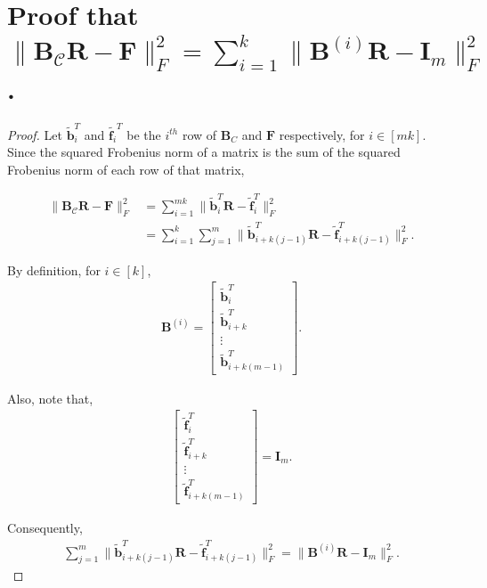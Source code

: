 \documentclass[journal,draftcls,onecolumn]{IEEEtran}
\theoremstyle{mystyle}
\newcommand{\aditya}[1]{\marginpar{+}{\bf Aditya's remark}: {\em #1}}
\newcommand{\sifat}[1]{\marginpar{+}{\bf Sifat's remark}: {\em #1}}
\begin{document}
\section{Proof that  ${\|\mathbf{B}_{\mathcal{C}} \mathbf{R}- \mathbf{F}\|_F^2}  = \sum_{i = 1}^k {\|\mathbf{B}^{(i)} \mathbf{R}- \mathbf{I}_m\|_F^2}$.}
\label{sec:appendix_claim_frob}
\begin{proof}

Let $\tilde{\mathbf{b}}_i^T$ and $\tilde{\mathbf{f}_i}^T$ be the $i^{th}$ row of $\mathbf{B}_C$ and $\mathbf{F}$ respectively, for $i \in [mk]$. Since the squared Frobenius norm of a matrix is the sum of the squared Frobenius norm of each row of that matrix, 

\begin{align*}
\|\mathbf{B}_{\mathcal{C}} \mathbf{R}- \mathbf{F}\|_F^2 &= \sum_{i = 1}^{mk} \|\tilde{\mathbf{b}}_i^T\mathbf{R}- \tilde{\mathbf{f}}_i^T\|_F^2\\
&= \sum_{i = 1}^k \sum_{j = 1}^m \|\tilde{\mathbf{b}}_{i+ k(j-1)}^T\mathbf{R}- \tilde{\mathbf{f}}_{i+ k(j-1)}^T\|_F^2.
\end{align*}

By definition, for $i \in [k]$, 
\begin{align*}
\mathbf{B}^{(i)}  = \begin{bmatrix}\tilde{\mathbf{b}}_{i}^T \\ \tilde{\mathbf{b}}_{i+ k}^T\\ \vdots \\ \tilde{\mathbf{b}}_{i+ k(m-1)}^T \end{bmatrix}.
\end{align*}

Also, note that, 
\begin{align*}
\begin{bmatrix}
\tilde{\mathbf{f}}_{i}^T \\ \tilde{\mathbf{f}}_{i+ k}^T\\ \vdots \\ \tilde{\mathbf{f}}_{i+ k(m-1)}^T \end{bmatrix} = \mathbf{I}_m.
\end{align*}

Consequently, 
\begin{align*}
\sum_{j = 1}^m \|\tilde{\mathbf{b}}_{i+ k(j-1)}^T\mathbf{R}- \tilde{\mathbf{f}}_{i+ k(j-1)}^T\|_F^2 = \|\mathbf{B}^{(i)}\mathbf{R} - \mathbf{I}_m\|_F^2.
\end{align*}
\end{proof}
\end{document}
